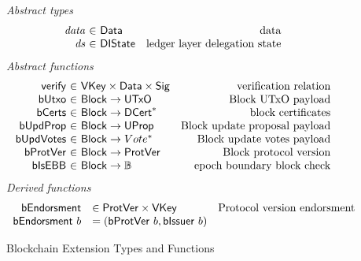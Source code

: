 \documentclass[11pt,a4paper]{article}
\newcommand{\var}[1]{\mathit{#1}}
\newcommand{\fun}[1]{\mathsf{#1}}
\newcommand{\type}[1]{\mathsf{#1}}
\newcommand{\seqof}[1]{#1^{*}}
\newcommand{\totalf}{\to}
\newcommand{\Block}{\type{Block}}
\newcommand{\DCert}{\type{DCert}}
\newcommand{\VKey}{\type{VKey}}
\newcommand{\Sig}{\type{Sig}}
\newcommand{\Data}{\type{Data}}
\newcommand{\DelegState}{\type{DIState}}
\newcommand{\verifyname}{verify}
\newcommand{\isebbname}{bIsEBB}
\newcommand{\bcertsname}{bCerts}
\newcommand{\bissuername}{bIssuer}
\newcommand{\bissuer}[1]{\fun{\bissuername} ~ #1}
\begin{document}
\begin{figure}[ht]
  \emph{Abstract types}
  \begin{equation*}
  \begin{array}{r@{~\in~}lr}
    \var{data} & \Data    & \text{data}\\
    \var{ds} & \DelegState & \text{ledger layer delegation state}
  \end{array}
  \end{equation*}
  \emph{Abstract functions}
  \begin{equation*}
  \begin{array}{r@{~\in~}lr}
    \fun{\verifyname} & \VKey \times \Data \times \Sig
      & \text{verification relation} \\
    \fun{bUtxo} & \Block \totalf \UTxO & \text{Block UTxO payload} \\
    \fun{\bcertsname} & \Block \totalf \seqof{\DCert}
      & \text{block certificates} \\
    \fun{bUpdProp} & \Block \totalf \UProp & \text{Block update proposal payload} \\
    \fun{bUpdVotes} & \Block \totalf \seqof{Vote} & \text{Block update votes payload} \\
    \fun{bProtVer} & \Block \totalf \ProtVer & \text{Block protocol version} \\
    \fun{\isebbname} & \Block \totalf \mathbb{B} & \text{epoch boundary block check} \\
  \end{array}
  \end{equation*}
  \emph{Derived functions}
  \begin{equation*}
    \begin{array}{rlr}
      \fun{bEndorsment} & \in \ProtVer \times \VKey & \text{Protocol version endorsment} \\
      \bendorsment{b} & = (\bprotver{b}, \bissuer{b})
    \end{array}
  \end{equation*}

  \caption{Blockchain Extension Types and Functions}
  \label{fig:defs:chain-extension}
\end{figure}
\end{document}
